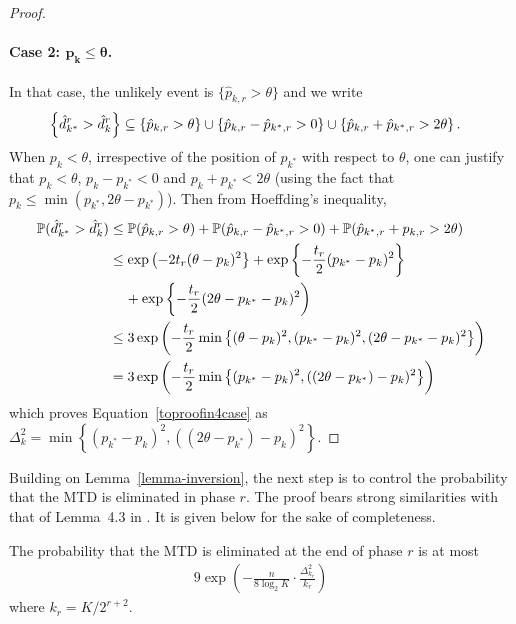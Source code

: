 \begin{proof}
\paragraph{Case 2: $\bm{p_k \leq \theta}$.} In that case, the unlikely event is $\{\hat{p}_{k,r} > \theta\}$ and we write 
\begin{align*}
&\Set{\hat{d}^r_{k^*} > \hat{d}^r_k} \subseteq 
\Set{\hat{p}_{k,r} > \theta} \cup \Set{\hat{p}_{{k},r} - \hat{p}_{k^*,r} > 0}\cup \Set{\hat{p}_{k,r} + \hat{p}_{{k^*},r} > 2\theta}.
\end{align*}
When $p_k < \theta$, irrespective of the position of $p_{k^*}$ with respect to $\theta$, one can justify that $p_k < \theta$, $p_{k} - p_{k^*} < 0$ and ${p}_{k} + {p}_{{k^*}} < 2\theta$ (using the fact that $p_k \leq \min(p_{k^*},2\theta - p_{k^*})$). Then from Hoeffding's inequality,  
\begin{align*}
\mathbb{P}(\hat{d}^r_{k^*} > \hat{d}^r_k) & \leq 
	\mathbb{P}(\hat{p}_{k,r} > \theta)
	+ \mathbb{P}(\hat{p}_{{k},r} - \hat{p}_{k^*,r} > 0)
	+ \mathbb{P}(\hat{p}_{k^*,r} + p_{k,r} > 2\theta)
\\ & \leq 
	\exp\left( -2t_r (\theta - p_k)^2 \right\}
	+ \exp\left\{ - \frac{t_r}{2} (p_{k^*} - p_k)^2 \right\}
\\ & \hspace{0.4cm}
	+ \exp\left\{ - \frac{t_r}{2} (2\theta - p_{k^*} - p_k)^2 \right)
\\ & \leq 
	3 \exp\left( -\frac{t_r}{2} \min\left\{(\theta - p_k)^2,
		(p_{k^*} - p_k)^2,
		(2\theta - p_{k^*} -p_k)^2
	  \right\} \right)
\\ & = 
	3 \exp\left( -\frac{t_r}{2} \min\left\{
		(p_{k^*} - p_{k})^2,
		((2\theta - p_{k^*}) - p_k)^2
	  \right\} \right)
\end{align*}
which proves Equation~\ref{toproofin4case} as $\Delta_k^2 =\min\left\{
		(p_{k^*} - p_{k})^2,
		((2\theta - p_{k^*}) - p_k)^2
	  \right\}$. 
\end{proof}


Building on Lemma~\ref{lemma-inversion}, the next step is to control the probability that the MTD is eliminated in phase $r$. The proof bears strong similarities with that of Lemma~4.3 in \cite{icml2013_karnin13}. It is given below for the sake of completeness. 

%
%
\begin{lemma}
\label{lemma-best-survives}
The probability that the MTD is eliminated at the end of phase $r$ is at most
\begin{align*}
9 \exp\left(
	- \frac{n}{8 \log_2 K} \cdot \frac{\Delta^2_{k_r}}{k_r}
\right)	
\end{align*}
where $k_r = K/2^{r + 2}$.
\end{lemma}
%
%

